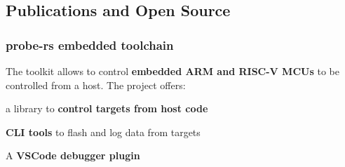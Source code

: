 \begin{timeline}

    
    \subsection{Publications and Open Source}

    \subsubsection{probe-rs embedded toolchain}
    The toolkit allows to control \textbf{embedded ARM and RISC-V MCUs} to be controlled from a host.
    The project offers:
    \begin{tightemize}
    \item a library to \textbf{control targets from host code}
    \item \textbf{CLI tools} to flash and log data from targets
    \item A \textbf{VSCode debugger plugin}
    \end{tightemize}
    \sectionsep
    
    

\end{timeline}
